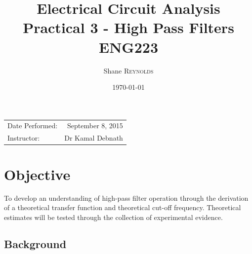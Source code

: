 \documentclass{article}
\title{Electrical Circuit Analysis \\ Practical 3 - High Pass Filters \\ ENG223} %
\author{Shane \textsc{Reynolds}} %
\date{\today} %
\begin{document}
\maketitle %

\begin{center}
\begin{tabular}{l r}
Date Performed: & September 8, 2015 \\ %
Instructor: & Dr Kamal Debnath %
\end{tabular}
\end{center}



\section{Objective}

To develop an understanding of high-pass filter operation through the derivation of a theoretical transfer function and theoretical cut-off frequency. Theoretical estimates will be tested through the collection of experimental evidence.

\subsection{Background}
\label{definitions}
\end{document}
